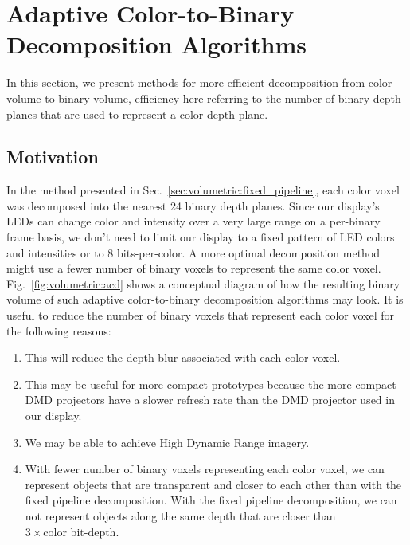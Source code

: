 \section{Adaptive Color-to-Binary Decomposition Algorithms}
\label{sec:volumetric:acd}

In this section, we present methods for more efficient decomposition from color-volume to binary-volume, efficiency here referring to the number of binary depth planes that are used to represent a color depth plane. 

\subsection{Motivation}

In the method presented in Sec.~\ref{sec:volumetric:fixed_pipeline}, each color voxel was decomposed into the nearest 24 binary depth planes. 
Since our display's LEDs can change color and intensity over a very large range on a per-binary frame basis, we don't need to limit our display to a fixed pattern of LED colors and intensities or to 8 bits-per-color. 
A more optimal decomposition method might use a fewer number of binary voxels to represent the same color voxel. 
Fig.~\ref{fig:volumetric:acd} shows a conceptual diagram of how the resulting binary volume of such adaptive color-to-binary decomposition algorithms may look.
It is useful to reduce the number of binary voxels that represent each color voxel for the following reasons:

\begin{enumerate}
    \item This will reduce the depth-blur associated with each color voxel.
    \item This may be useful for more compact prototypes because the more compact DMD projectors have a slower refresh rate than the DMD projector used in our display.
    \item We may be able to achieve High Dynamic Range imagery.
    \item With fewer number of binary voxels representing each color voxel, we can represent objects that are transparent and closer to each other than with the fixed pipeline decomposition. With the fixed pipeline decomposition, we can not represent objects along the same depth that are closer than $3 \times \text{color bit-depth}$. 
\end{enumerate}

